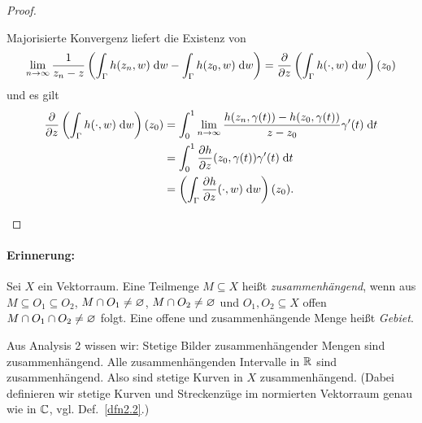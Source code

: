 \documentclass[a4paper,twoside,DIV15,BCOR12mm]{scrbook}
\begin{document}
\begin{proof}
\begin{enumerate}
Majorisierte Konvergenz liefert die Existenz von
\[\displaystyle\lim_{n\rightarrow\infty}\frac{1}{z_n-z}\left(\int_{\Gamma}^{}{h(z_n,w)}\;\mathrm{d} w-\int_{\Gamma}^{}{h(z_0,w)}\;\mathrm{d} w\right) = \frac{\partial}{\partial z}\left(\int_{\Gamma}^{}{h(\cdot,w)}\;\mathrm{d} w\right)(z_0)\]
und es gilt
\begin{align*}
\frac{\partial}{\partial z}\left(\integral{\Gamma}{}{h(\cdot,w)}{w}\right)(z_0) &=\integral{0}{1}{\limf{n}\frac{h(z_n,\gamma(t))-h(z_0,\gamma(t))}{z-z_0}\gamma^\prime(t)}{t}\\
&=\integral{0}{1}{\frac{\partial h}{\partial z}(z_0,\gamma(t))\gamma^\prime(t)}{t}\\
&=\left(\integral{\Gamma}{}{\frac{\partial h}{\partial z}(\cdot,w)}{w}\right)(z_0).\tag*{\qedhere}%
\end{align*}
\end{enumerate}\end{proof}

\paragraph{Erinnerung:} Sei $X$ ein Vektorraum. Eine Teilmenge $M\subseteq X$ heißt \emph{zusammenhängend}, wenn aus $M\subseteq
O_1\subseteq O_2$, $M\cap O_1\neq \varnothing$, $M\cap O_2\neq\varnothing$ und $O_1,O_2\subseteq X$ offen $M\cap O_1 \cap O_2 \neq \varnothing$
folgt. Eine offene und zusammenhängende Menge heißt \emph{Gebiet}.

\begin{bem*}
  Aus Analysis 2 wissen wir: Stetige Bilder zusammenhängender Mengen sind zusammenhängend. Alle zusammenhängenden Intervalle in
  $\mathbb{R}$ sind zusammenhängend. Also sind stetige Kurven in $X$ zusammenhängend. (Dabei definieren wir stetige Kurven und
  Streckenzüge im normierten Vektorraum genau wie in $\mathbb{C}$, vgl. Def.~\ref{dfn2.2}.)
\end{bem*}
\end{document}
